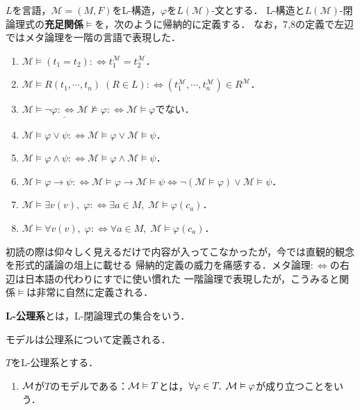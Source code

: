 \documentclass[uplatex, dvipdfmx]{jsreport}
\begin{document}
\begin{definition}
    $L$を言語，$\mathcal{M}=(M,F)$をL-構造，$\varphi$を$L(\mathcal{M})$-文とする．
    L-構造と$L(\mathcal{M})$-閉論理式の\textbf{充足関係}$\vDash$を，次のように帰納的に定義する．
    なお，7,8の定義で左辺ではメタ論理を一階の言語で表現した．
    \begin{enumerate}
        \item $\mathcal{M}\vDash(t_1=t_2):\Leftrightarrow t^\mathcal{M}_1=t_2^\mathcal{M}$．
        \item $\mathcal{M}\vDash R(t_1,\cdots,t_n)\;(R\in L):\Leftrightarrow (t_1^\mathcal{M},\cdots,t_n^\mathcal{M})\in R^\mathcal{M}$．
        \item $\underline{\mathcal{M}\vDash\lnot\varphi:\Leftrightarrow\mathcal{M}\nvDash\varphi}:\Leftrightarrow\mathcal{M}\vDash\varphi$でない．
        \item $\mathcal{M}\vDash\varphi\lor\psi:\Leftrightarrow\mathcal{M}\vDash\varphi\lor\mathcal{M}\vDash\psi$．
        \item $\mathcal{M}\vDash\varphi\land\psi:\Leftrightarrow\mathcal{M}\vDash\varphi\land\mathcal{M}\vDash\psi$．
        \item $\mathcal{M}\vDash\varphi\to\psi:\Leftrightarrow\mathcal{M}\vDash\varphi\to\mathcal{M}\vDash\psi\Leftrightarrow\lnot(\mathcal{M}\vDash\varphi)\lor\mathcal{M}\vDash\psi$．
        \item $\mathcal{M}\vDash\exists v(v),\;\varphi:\Leftrightarrow\exists a\in M,\; \mathcal{M}\vDash\varphi(c_a)$．
        \item $\mathcal{M}\vDash\forall v(v),\;\varphi:\Leftrightarrow\forall a\in M,\; \mathcal{M}\vDash\varphi(c_a)$．
    \end{enumerate}
\end{definition}
\begin{remark}
    初読の際は仰々しく見えるだけで内容が入ってこなかったが，今では直観的観念を形式的議論の俎上に載せる
    帰納的定義の威力を痛感する．メタ論理$:\Leftrightarrow$の右辺は日本語の代わりにすでに使い慣れた
    一階論理で表現したが，こうみると関係$\vDash$は非常に自然に定義される．
\end{remark}

\begin{definition}[theory]
    \textbf{L-公理系}とは，L-閉論理式の集合をいう．
\end{definition}

モデルは公理系について定義される．

\begin{definition}[model]
    $T$をL-公理系とする．
    \begin{enumerate}
        \item $\mathcal{M}$が$T$のモデルである：$\mathcal{M}\vDash T$とは，$\forall\varphi\in T,\; \mathcal{M}\vDash\varphi$が成り立つことをいう．
    \end{enumerate}
\end{definition}
\end{document}
